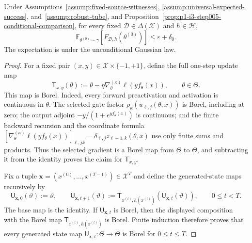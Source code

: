 \begin{proposition}
\label{prop:p1-i3-step006-event-split}
Under Assumptions~\ref{assump:fixed-source-witnesses},
\ref{assump:universal-expected-success}, and~\ref{assump:robust-tube}, and
Proposition~\ref{prop:p1-i3-step005-conditional-comparison}, for every fixed
$\mathcal D\in\Delta(\mathcal X)$ and $h\in\mathcal H$,
\[
\mathbb E_{\theta^{(0)}\sim\gamma}
[F_{\mathcal D,h}(\theta^{(0)})]\leq\varepsilon+\delta_0.
\tag{84}
\]
The expectation is under the unconditional Gaussian law.
\end{proposition}

\begin{proof}
For a fixed pair $(x,y)\in\mathcal X\times\{-1,+1\}$, define the full
one-step update map
\[
\mathsf T_{x,y}(\theta)
:=\theta-\eta\nabla_\theta^{(\kappa)}
\ell\!\left(yf_\theta(x)\right),
\qquad \theta\in\Theta.
\]
This map is Borel.  Indeed, every forward preactivation and activation is
continuous in $\theta$.  The selected gate factor
$\rho_\kappa(u_{\ell,j}(\theta,x))$ is Borel, including at zero; the output
adjoint $-y/(1+e^{yf_\theta(x)})$ is continuous; and the finite backward
recursion and the coordinate formula
$[\nabla_\theta^{(\kappa)}\ell(yf_\theta(x))]_{\ell,jk}
=\delta_{\ell,j}z_{\ell-1,k}(\theta,x)$ use only finite sums and products.
Thus the selected gradient is a Borel map from $\Theta$ to $\Theta$, and
subtracting it from the identity proves the claim for $\mathsf T_{x,y}$.

Fix a tuple
$\mathbf x=(x^{(0)},\ldots,x^{(T-1)})\in\mathcal X^T$ and define the
generated-state maps recursively by
\[
\mathsf U_{\mathbf x,0}(\vartheta):=\vartheta,
\qquad
\mathsf U_{\mathbf x,t+1}(\vartheta)
:=\mathsf T_{x^{(t)},h(x^{(t)})}
   (\mathsf U_{\mathbf x,t}(\vartheta)),
\qquad 0\leq t<T.
\]
The base map is the identity.  If $\mathsf U_{\mathbf x,t}$ is Borel, then
the displayed composition with the Borel map
$\mathsf T_{x^{(t)},h(x^{(t)})}$ is Borel.  Finite induction therefore proves
that every generated state map $\mathsf U_{\mathbf x,t}:\Theta\to\Theta$ is
Borel for $0\leq t\leq T$.


\end{proof}
